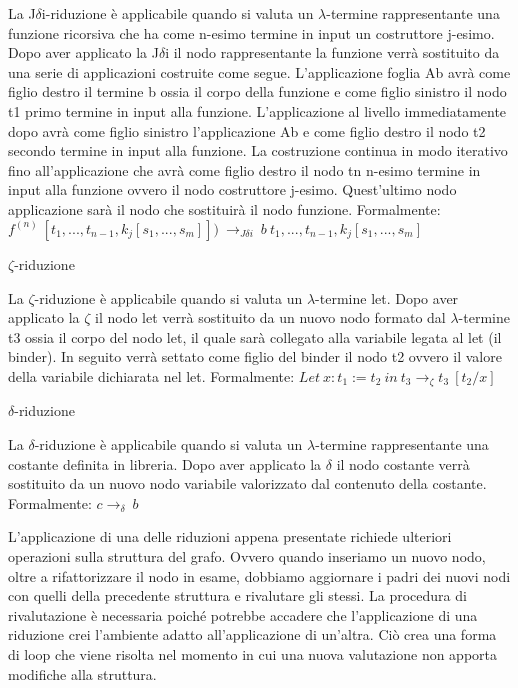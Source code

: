 \documentclass[12pt,a4paper,openright,twoside]{report}
\begin{document}
La J$\delta$i-riduzione \`e applicabile quando si valuta un $\lambda$-termine rappresentante una funzione ricorsiva che ha come n-esimo termine in input un costruttore j-esimo. Dopo aver applicato la J$\delta$i il nodo rappresentante la funzione verr\`a sostituito da una serie di applicazioni costruite come segue. L'applicazione foglia Ab avr\`a come figlio destro il termine b ossia il corpo della funzione e come figlio sinistro il nodo t1 primo termine in input alla funzione. L'applicazione al livello immediatamente dopo avr\`a come figlio sinistro l'applicazione Ab e come figlio destro il nodo t2 secondo termine in input alla funzione. La costruzione continua in modo iterativo fino all'applicazione che avr\`a come figlio destro il nodo tn n-esimo termine in input alla funzione ovvero il nodo costruttore j-esimo. Quest'ultimo nodo applicazione sar\`a il nodo che sostituir\`a il nodo funzione.\newline
Formalmente: $f^{(n)}\> [t_1, ..., t_{n-1}, k_j [s_1, ..., s_m]])\> \rightarrow_{J\delta i} \>b\>t_1, ..., t_{n-1}, k_j [s_1, ..., s_m] $\newline

$\zeta$-riduzione

La $\zeta$-riduzione \`e applicabile quando si valuta un $\lambda$-termine let. Dopo aver applicato la $\zeta$ il nodo let verr\`a sostituito da un nuovo nodo formato dal $\lambda$-termine t3 ossia il corpo del nodo let, il quale sar\`a collegato alla variabile legata al let (il binder). In seguito verr\`a settato come figlio del binder il nodo t2 ovvero il valore della variabile dichiarata nel let.\newline
Formalmente: $Let\> x:t_1 := t_2\> in\> t_3 \rightarrow_\zeta t_3\> [t_2/x]$\newline

$\delta$-riduzione

La $\delta$-riduzione \`e applicabile quando si valuta un $\lambda$-termine rappresentante una costante definita in libreria. Dopo aver applicato la $\delta$ il nodo costante verr\`a sostituito da un nuovo nodo variabile valorizzato dal contenuto della costante.\newline
Formalmente: $c \rightarrow_\delta\> b$\newline


L'applicazione di una delle riduzioni appena presentate richiede ulteriori operazioni sulla struttura del grafo. Ovvero quando inseriamo un nuovo nodo, oltre a rifattorizzare il nodo in esame, dobbiamo aggiornare i padri dei nuovi nodi con quelli della precedente struttura e rivalutare gli stessi. La procedura di rivalutazione \`e necessaria poich\'e potrebbe accadere che l'applicazione di una riduzione crei l'ambiente adatto all'applicazione di un'altra. Ci\`o crea una forma di loop che viene risolta nel momento in cui una nuova valutazione non apporta modifiche alla struttura.\newline
\end{document}
